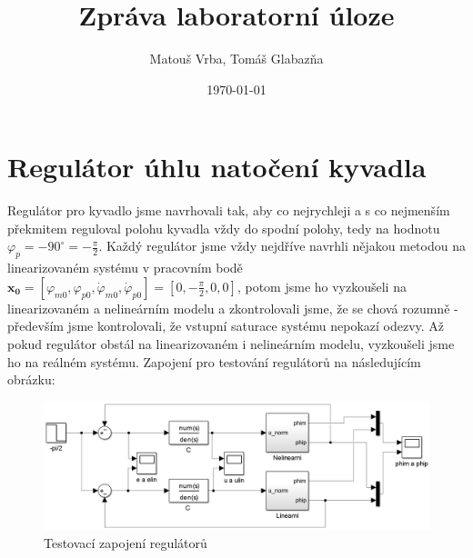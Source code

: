 \documentclass[a4paper,12pt]{article}
\title{Zpráva laboratorní úloze}
\author{Matouš Vrba, Tomáš Glabazňa}
\date{\today}
\begin{document}
\maketitle
\pagebreak

\section{Regulátor úhlu natočení kyvadla}
Regulátor pro kyvadlo jsme navrhovali tak, aby co nejrychleji a s co nejmenším překmitem reguloval polohu kyvadla vždy do spodní polohy, tedy na hodnotu $\varphi_p=-90^{\circ}=-\frac{\pi}{2}$. Každý regulátor jsme vždy nejdříve navrhli nějakou metodou na linearizovaném systému v pracovním bodě $\mathbf{x_0} = \left[\varphi_{m0}, \varphi_{p0}, \dot{\varphi}_{m0}, \dot{\varphi}_{p0}\right] = \left[0, -\frac{\pi}{2}, 0, 0\right]$, potom jsme ho vyzkoušeli na linearizovaném a nelineárním modelu a zkontrolovali jsme, že se chová rozumně - především jsme kontrolovali, že vstupní saturace systému nepokazí odezvy. Až pokud regulátor obstál na linearizovaném i nelineárním modelu, vyzkoušeli jsme ho na reálném systému. Zapojení pro testování regulátorů na následujícím obrázku:
\begin{figure}[H]
	\centering
    \includegraphics[scale=0.25]{schema_rizeni_nanecisto}
    \caption{Testovací zapojení regulátorů}
\end{figure}
\end{document}
